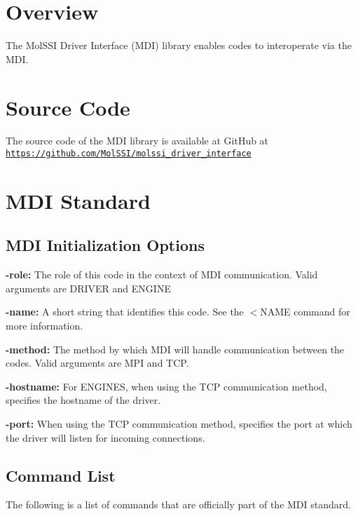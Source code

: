\hypertarget{index_overview_sec}{}\section{Overview}\label{index_overview_sec}
The Mol\-S\-S\-I Driver Interface (M\-D\-I) library enables codes to interoperate via the M\-D\-I.\hypertarget{index_source_sec}{}\section{Source Code}\label{index_source_sec}
The source code of the M\-D\-I library is available at Git\-Hub at \href{https://github.com/MolSSI/molssi_driver_interface}{\tt https\-://github.\-com/\-Mol\-S\-S\-I/molssi\-\_\-driver\-\_\-interface}\hypertarget{index_commands_sec}{}\section{M\-D\-I Standard}\label{index_commands_sec}
\hypertarget{index_initialization_options}{}\subsection{M\-D\-I Initialization Options}\label{index_initialization_options}
\begin{DoxyParagraph}{}
{\bfseries  -\/role\-: } The role of this code in the context of M\-D\-I communication. Valid arguments are D\-R\-I\-V\-E\-R and E\-N\-G\-I\-N\-E \par
 {\bfseries  -\/name\-: } A short string that identifies this code. See the {\ttfamily $<$N\-A\-M\-E} command for more information. \par
 {\bfseries  -\/method\-: } The method by which M\-D\-I will handle communication between the codes. Valid arguments are M\-P\-I and T\-C\-P. \par
 {\bfseries  -\/hostname\-: } For E\-N\-G\-I\-N\-E\-S, when using the T\-C\-P communication method, specifies the hostname of the driver. \par
 {\bfseries  -\/port\-: } When using the T\-C\-P communication method, specifies the port at which the driver will listen for incoming connections.
\end{DoxyParagraph}
\hypertarget{index_command_list}{}\subsection{Command List}\label{index_command_list}
The following is a list of commands that are officially part of the M\-D\-I standard.

